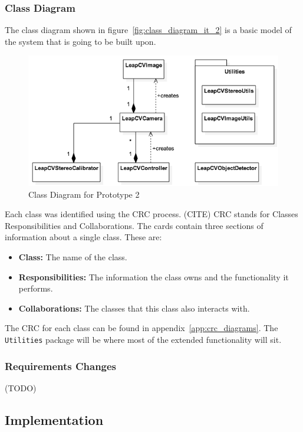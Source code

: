 \documentclass[11pt,oneside]{report}
\newcommand\code[1]{\texttt{#1}}
\begin{document}
		\subsubsection{Class Diagram}
		The class diagram shown in figure~\ref{fig:class_diagram_it_2} is a basic model of the system that is going to be built upon.
		\begin{figure}[ht]
		\begin{center}
    			\includegraphics[scale=0.65]{class_diagram_it_2}
    			\caption{Class Diagram for Prototype 2 \protect {\label{fig:class_diagram_it_2}}}
    		\end{center}
		\end{figure}			
		Each class was identified using the CRC process. (CITE)
		CRC stands for Classes Responsibilities and Collaborations.
		The cards contain three sections of information about a single class.
		These are:
		\begin{itemize}
			\item \textbf{Class:} The name of the class.
			\item \textbf{Responsibilities:} The information the class owns and the functionality it performs.
			\item \textbf{Collaborations:} The classes that this class also interacts with.
		\end{itemize}
		
		The CRC for each class can be found in appendix~\ref{app:crc_diagrams}.
		The \code{Utilities} package will be where most of the extended functionality will sit.
		\subsubsection{Requirements Changes}
			(TODO)
		\subsection{Implementation}
\end{document}
